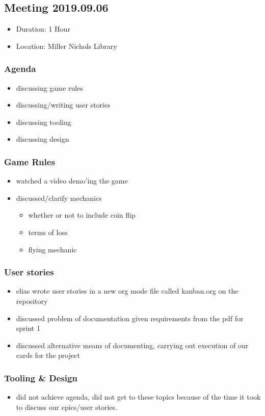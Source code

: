 \documentclass[11pt]{article}
\begin{document}
\subsection{Meeting 2019.09.06}
\label{sec:org62e870b}
\begin{itemize}
\item Duration: 1 Hour
\item Location: Miller Nichols Library
\end{itemize}
\subsubsection*{Agenda}
\label{sec:orgda34ad4}
\begin{itemize}
\item discussing game rules
\item discussing/writing user stories
\item discussing tooling
\item discussing design
\end{itemize}
\subsubsection*{Game Rules}
\label{sec:org556cfe1}
\begin{itemize}
\item watched a video demo'ing the game
\item discussed/clarify mechanics
\begin{itemize}
\item whether or not to include coin flip
\item terms of loss
\item flying mechanic
\end{itemize}
\end{itemize}
\subsubsection*{User stories}
\label{sec:org2f71e1a}
\begin{itemize}
\item elias wrote user stories in a new org mode file called kanban.org on the
repository
\item discussed problem of documentation given requirements from the pdf for
sprint 1
\item discussed alternative means of documenting, carrying out execution of our
cards for the project
\end{itemize}
\subsubsection*{Tooling \& Design}
\label{sec:org6c6889d}
\begin{itemize}
\item did not achieve agenda, did not get to these topics because of the time
it took to discuss our epics/user stories.
\end{itemize}
\end{document}
